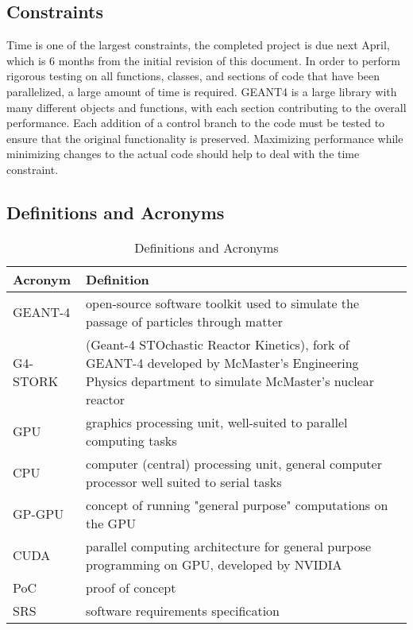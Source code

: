 \documentclass[12pt]{article}
\begin{document}
\subsection{Constraints} %
Time is one of the largest constraints, the completed project is due next April, which is 6 months from the initial revision of this document. In order to perform rigorous testing on all functions, classes, and sections of code that have been parallelized, a  large amount of time is required. GEANT4 is a large library with many different objects and functions, with each section contributing to the overall performance. Each addition of a control branch to the code must be tested to ensure that the original functionality is preserved. Maximizing performance while minimizing changes to the actual code should help to deal with the time constraint.
\newpage
\subsection{Definitions and Acronyms} %
\begin{center}
\begin{longtable}{>{\raggedright\arraybackslash}p{}>{\raggedright\arraybackslash}p{}}
\caption{Definitions and Acronyms}\label{Table_Acronyms}\\
\toprule

\bf Acronym & \bf Definition\\\midrule
GEANT-4 & open-source software toolkit used to simulate the passage of particles through matter\\\midrule
G4-STORK & (Geant-4 STOchastic Reactor Kinetics), fork of GEANT-4 developed by McMaster's Engineering Physics department to simulate McMaster's nuclear reactor\\\midrule
GPU & graphics processing unit, well-suited to parallel computing tasks\\\midrule
CPU & computer (central) processing unit, general computer processor well suited to serial tasks\\\midrule
GP-GPU & concept of running "general purpose" computations on the GPU\\\midrule
CUDA & parallel computing architecture for general purpose programming on GPU, developed by NVIDIA\\\midrule
PoC & proof of concept\\\midrule
SRS & software requirements specification\\

\bottomrule
\end{longtable}
\end{center}
\end{document}
